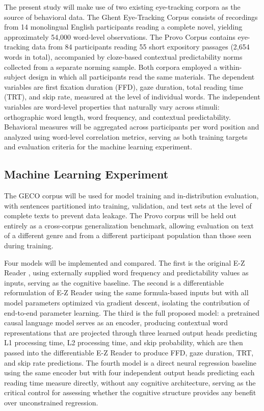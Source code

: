 \documentclass[12pt]{article}
\begin{document}
The present study will make use of two existing eye-tracking corpora as the
source of behavioral data. The Ghent Eye-Tracking Corpus
\citep[GECO;][]{cop2017presenting} consists of recordings from 14 monolingual
English participants reading a complete novel, yielding approximately 54,000
word-level observations. The Provo Corpus \citep{luke2018provo} contains
eye-tracking data from 84 participants reading 55 short expository passages
(2,654 words in total), accompanied by cloze-based contextual predictability
norms collected from a separate norming sample. Both corpora employed a
within-subject design in which all participants read the same materials. The
dependent variables are first fixation duration (FFD), gaze duration, total
reading time (TRT), and skip rate, measured at the level of individual words.
The independent variables are word-level properties that naturally vary across
stimuli: orthographic word length, word frequency, and contextual
predictability. Behavioral measures will be aggregated across participants per
word position and analyzed using word-level correlation metrics, serving as
both training targets and evaluation criteria for the machine learning
experiment.

\subsection{Machine Learning Experiment}

The GECO corpus will be used for model training and in-distribution evaluation,
with sentences partitioned into training, validation, and test sets at the
level of complete texts to prevent data leakage. The Provo corpus will be held
out entirely as a cross-corpus generalization benchmark, allowing evaluation on
text of a different genre and from a different participant population than those
seen during training.

Four models will be implemented and compared. The first is the original E-Z
Reader \citep{reichle1998toward}, using externally supplied word frequency and
predictability values as inputs, serving as the cognitive baseline. The second
is a differentiable reformulation of E-Z Reader using the same formula-based
inputs but with all model parameters optimized via gradient descent, isolating
the contribution of end-to-end parameter learning. The third is the full
proposed model: a pretrained causal language model serves as an encoder,
producing contextual word representations that are projected through three
learned output heads predicting L1 processing time, L2 processing time, and
skip probability, which are then passed into the differentiable E-Z Reader to
produce FFD, gaze duration, TRT, and skip rate predictions. The fourth model is
a direct neural regression baseline using the same encoder but with four
independent output heads predicting each reading time measure directly, without
any cognitive architecture, serving as the critical control for assessing
whether the cognitive structure provides any benefit over unconstrained
regression.
\end{document}
